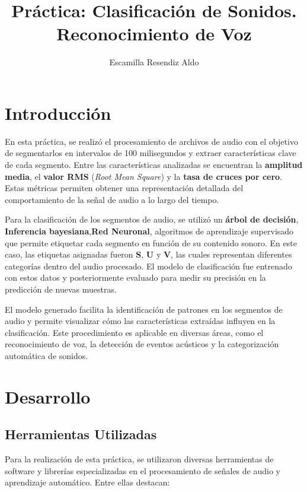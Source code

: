 \documentclass{report}
\title{\Huge{\textbf{Práctica: Clasificación de Sonidos.}}\\
\Large{\textbf{Reconocimiento de Voz}}}
\author{Escamilla Resendiz Aldo}
\begin{document}
    \maketitle
    \tableofcontents
    \newpage
    \section{Introducción}

    En esta práctica, se realizó el procesamiento de archivos de audio con el objetivo de segmentarlos en intervalos de 100 milisegundos y extraer características clave de cada segmento. Entre las características analizadas se encuentran la \textbf{amplitud media}, el \textbf{valor RMS} (\textit{Root Mean Square}) y la \textbf{tasa de cruces por cero}. Estas métricas permiten obtener una representación detallada del comportamiento de la señal de audio a lo largo del tiempo.

    Para la clasificación de los segmentos de audio, se utilizó un \textbf{árbol de decisión}, \textbf{Inferencia bayesiana},\textbf{Red Neuronal}, algoritmos de aprendizaje supervisado que permite etiquetar cada segmento en función de su contenido sonoro. En este caso, las etiquetas asignadas fueron \textbf{S}, \textbf{U} y \textbf{V}, las cuales representan diferentes categorías dentro del audio procesado. El modelo de clasificación fue entrenado con estos datos y posteriormente evaluado para medir su precisión en la predicción de nuevas muestras.

    El modelo generado facilita la identificación de patrones en los segmentos de audio y permite visualizar cómo las características extraídas influyen en la clasificación. Este procedimiento es aplicable en diversas áreas, como el reconocimiento de voz, la detección de eventos acústicos y la categorización automática de sonidos.

    
\section{Desarrollo}

\subsection{Herramientas Utilizadas}

Para la realización de esta práctica, se utilizaron diversas herramientas de software y librerías especializadas en el procesamiento de señales de audio y aprendizaje automático. Entre ellas destacan:
\end{document}

